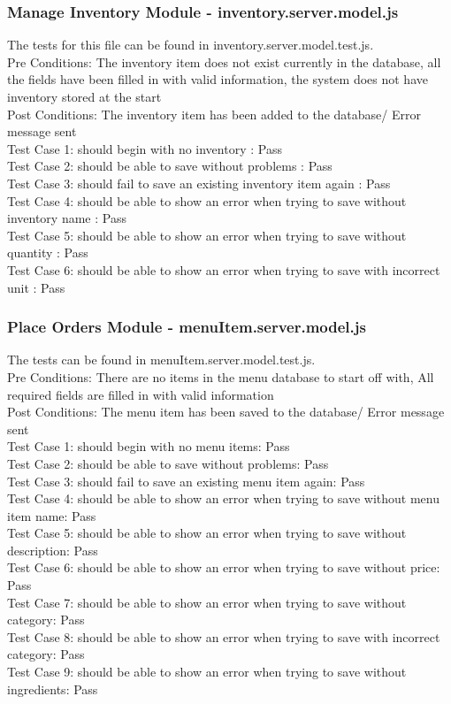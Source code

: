 \documentclass[a4paper,12pt]{article}
\begin{document}
 \subsubsection{Manage Inventory Module - inventory.server.model.js}
 The tests for this file can be found in inventory.server.model.test.js. \\
Pre Conditions: The inventory item does not exist currently in the database,
all the fields have been filled in with valid information, the system does not have inventory stored at the start \\
Post Conditions: The inventory item has been added to the database/  Error message sent\\
Test Case 1: should begin with no inventory : Pass\\
Test Case 2: should be able to save without problems : Pass\\
Test Case 3: should fail to save an existing inventory item again : Pass\\
Test Case 4: should be able to show an error when trying to save without inventory name : Pass\\
Test Case 5: should be able to show an error when trying to save without quantity : Pass\\
Test Case 6: should be able to show an error when trying to save with incorrect unit : Pass\\
 
  \subsubsection{Place Orders Module - menuItem.server.model.js}
 
The tests can be found in menuItem.server.model.test.js.\\
Pre Conditions: There are no items in the menu database to start off with, All required fields are filled in with valid information\\
Post Conditions: The menu item has been saved to the database/ Error message sent\\
Test Case 1: should begin with no menu items: Pass\\
Test Case 2: should be able to save without problems: Pass\\
Test Case 3: should fail to save an existing menu item again: Pass\\
Test Case 4: should be able to show an error when trying to save without menu item name: Pass\\
Test Case 5: should be able to show an error when trying to save without description: Pass\\
Test Case 6: should be able to show an error when trying to save without price: Pass\\
Test Case 7: should be able to show an error when trying to save without category: Pass\\
Test Case 8: should be able to show an error when trying to save with incorrect category: Pass\\
Test Case 9: should be able to show an error when trying to save without ingredients: Pass\\
\end{document}
